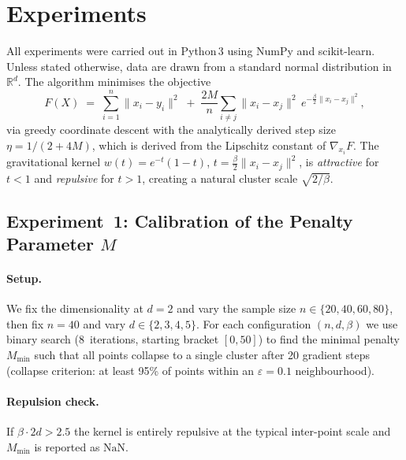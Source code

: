 \documentclass[11pt, a4paper]{article}
\begin{document}
\section{Experiments}
\label{sec:experiments}

All experiments were carried out in Python\,3 using NumPy and
scikit-learn.  Unless stated otherwise, data are drawn from a standard
normal distribution in $\mathbb{R}^d$.  The algorithm minimises the
objective
\begin{equation}
  \label{eq:objective}
  F(X) \;=\;
  \sum_{i=1}^n \|x_i - y_i\|^2
  \;+\;
  \frac{2M}{n}
  \sum_{i \neq j}
  \|x_i - x_j\|^2 \,
  e^{-\tfrac{\beta}{2}\|x_i - x_j\|^2},
\end{equation}
via greedy coordinate descent with the analytically derived step size
$\eta = 1/(2 + 4M)$, which is derived from the Lipschitz constant of
$\nabla_{x_i} F$.  The gravitational kernel
$w(t) = e^{-t}(1-t)$, $t = \tfrac{\beta}{2}\|x_i - x_j\|^2$, is
\emph{attractive} for $t < 1$ and \emph{repulsive} for $t > 1$,
creating a natural cluster scale $\sqrt{2/\beta}$.

\subsection{Experiment~1: Calibration of the Penalty Parameter $M$}
\label{sec:exp1}

\paragraph{Setup.}
We fix the dimensionality at $d = 2$ and vary the sample size
$n \in \{20, 40, 60, 80\}$, then fix $n = 40$ and vary
$d \in \{2, 3, 4, 5\}$.  For each configuration $(n, d, \beta)$ we
use binary search (8~iterations, starting bracket $[0, 50]$) to find
the minimal penalty $M_{\min}$ such that all points collapse to a
single cluster after 20 gradient steps (collapse criterion: at least
95\% of points within an $\varepsilon = 0.1$ neighbourhood).

\paragraph{Repulsion check.}
If $\beta \cdot 2d > 2.5$ the kernel is entirely repulsive at the
typical inter-point scale and $M_{\min}$ is reported as $\mathrm{NaN}$.
\end{document}
